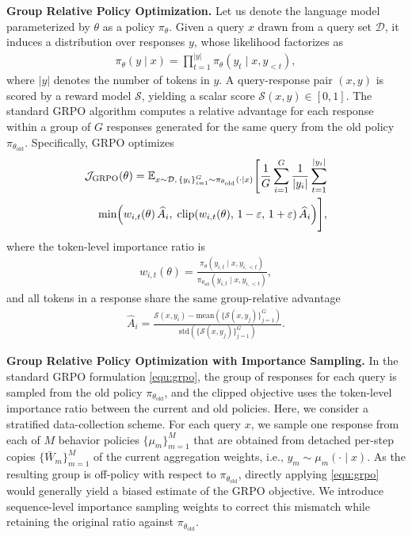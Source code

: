 \documentclass{article}
\theoremstyle{plain}
\theoremstyle{definition}
\theoremstyle{remark}
\begin{document}
\textbf{Group Relative Policy Optimization.}
Let us denote the language model parameterized by $\theta$ as a policy $\pi_\theta$.
Given a query $x$ drawn from a query set $\mathcal{D}$, it induces a distribution over responses $y$, whose likelihood factorizes as 
\begin{align*}
\pi_\theta(y\mid x)=\prod_{t=1}^{|y|}\pi_\theta(y_t\mid x,y_{<t}),
\end{align*} where $|y|$ denotes the number of tokens in $y$.
A query-response pair $(x,y)$ is scored by a reward model $\mathcal{S}$, yielding a scalar score $\mathcal{S}(x,y)\in[0,1]$.
The standard GRPO algorithm computes a relative advantage for each response within a group of $G$ responses generated for the same query from the old policy $\pi_{\theta_\text{old}}$.
Specifically, GRPO optimizes
\begin{align}
\label{equ:grpo}
\mathcal{J}_\text{GRPO}(\theta) =
\mathbb{E}_{x \sim \mathcal{D},\, \{y_i\}_{i=1}^{G} \sim \pi_{\theta_\text{old}}(\cdot \mid x)}
\Bigg[
\frac{1}{G}\sum_{i=1}^{G}\frac{1}{|y_i|}\sum_{t=1}^{|y_i|}
\notag\\
\min\!\Big(
w_{i,t}(\theta)\,\widehat{A}_{i},\;
\mathrm{clip}\!\left(w_{i,t}(\theta),\,1-\varepsilon,\,1+\varepsilon\right)\widehat{A}_{i}
\Big)
\Bigg],
\end{align}
where the token-level importance ratio is 
\begin{align*}
    w_{i,t}(\theta)=\frac{\pi_\theta(y_{i,t}\mid x,y_{i,<t})}{\pi_{\theta_\text{old}}(y_{i,t}\mid x,y_{i,<t})},
\end{align*} and all tokens in a response share the same group-relative advantage
\begin{align*}
\widehat{A}_{i}=\frac{\mathcal{S}(x,y_i)-\mathrm{mean}(\{\mathcal{S}(x,y_j)\}_{j=1}^{G})}{\mathrm{std}(\{\mathcal{S}(x,y_j)\}_{j=1}^{G})}.
\end{align*}

\textbf{Group Relative Policy Optimization with Importance Sampling.}
In the standard GRPO formulation \eqref{equ:grpo}, the group of responses for each query is sampled from the old policy $\pi_{\theta_\text{old}}$, and the clipped objective uses the token-level importance ratio between the current and old policies.
Here, we consider a stratified data-collection scheme. For each query $x$, we sample one response from each of $M$ behavior policies $\{\mu_m\}_{m=1}^M$ that are obtained from detached per-step copies $\{\bar W_m\}_{m=1}^M$ of the current aggregation weights, i.e., $y_m \sim \mu_m(\cdot \mid x)$.
As the resulting group is off-policy with respect to $\pi_{\theta_\text{old}}$, directly applying \eqref{equ:grpo} would generally yield a biased estimate of the GRPO objective.
We introduce sequence-level importance sampling weights to correct this mismatch while retaining the original ratio against $\pi_{\theta_\text{old}}$.
\end{document}
